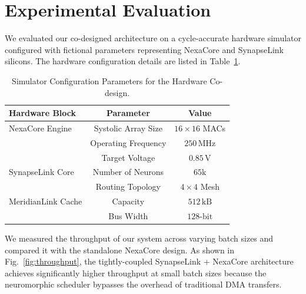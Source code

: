 \section{Experimental Evaluation}
\label{sec:evaluation}

We evaluated our co-designed architecture on a cycle-accurate hardware simulator configured with fictional parameters representing NexaCore and SynapseLink silicons. The hardware configuration details are listed in Table~\ref{tab:config}.

\begin{table}[htbp]
\centering
\caption{Simulator Configuration Parameters for the Hardware Co-design.}
\label{tab:config}
\vspace{0.2cm}
\setlength{\tabcolsep}{4pt}
\small
\begin{tabular}{lcc}
\toprule
\textbf{Hardware Block} & \textbf{Parameter} & \textbf{Value} \\
\midrule
NexaCore Engine         & Systolic Array Size & $16 \times 16$ MACs \\
                        & Operating Frequency & $250\,\text{MHz}$ \\
                        & Target Voltage      & $0.85\,\text{V}$ \\
\midrule
SynapseLink Core        & Number of Neurons   & $65\text{k}$ \\
                        & Routing Topology    & $4 \times 4$ Mesh \\
\midrule
MeridianLink Cache      & Capacity            & $512\,\text{kB}$ \\
                        & Bus Width           & $128\text{-bit}$ \\
\bottomrule
\end{tabular}
\end{table}

We measured the throughput of our system across varying batch sizes and compared it with the standalone NexaCore design. As shown in Fig.~\ref{fig:throughput}, the tightly-coupled SynapseLink + NexaCore architecture achieves significantly higher throughput at small batch sizes because the neuromorphic scheduler bypasses the overhead of traditional DMA transfers.

